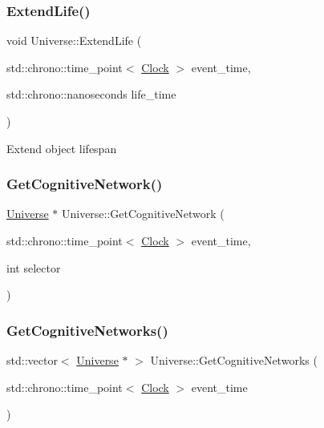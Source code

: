 \subsubsection{\texorpdfstring{Extend\+Life()}{ExtendLife()}}
{\footnotesize\ttfamily void Universe\+::\+Extend\+Life (\begin{DoxyParamCaption}\item[{std\+::chrono\+::time\+\_\+point$<$ \mbox{\hyperlink{universe_8h_a0ef8d951d1ca5ab3cfaf7ab4c7a6fd80}{Clock}} $>$}]{event\+\_\+time,  }\item[{std\+::chrono\+::nanoseconds}]{life\+\_\+time }\end{DoxyParamCaption})}

Extend object lifespan\mbox{\label{classUniverse_a1ea2b7e438bfdc7dd599aa59c310b126}} 
\subsubsection{\texorpdfstring{Get\+Cognitive\+Network()}{GetCognitiveNetwork()}}
{\footnotesize\ttfamily \mbox{\hyperlink{classUniverse}{Universe}} $\ast$ Universe\+::\+Get\+Cognitive\+Network (\begin{DoxyParamCaption}\item[{std\+::chrono\+::time\+\_\+point$<$ \mbox{\hyperlink{universe_8h_a0ef8d951d1ca5ab3cfaf7ab4c7a6fd80}{Clock}} $>$}]{event\+\_\+time,  }\item[{int}]{selector }\end{DoxyParamCaption})}

\mbox{\label{classUniverse_a06968a24194280a43f077c5b77379ea8}} 
\subsubsection{\texorpdfstring{Get\+Cognitive\+Networks()}{GetCognitiveNetworks()}}
{\footnotesize\ttfamily std\+::vector$<$ \mbox{\hyperlink{classUniverse}{Universe}} $\ast$ $>$ Universe\+::\+Get\+Cognitive\+Networks (\begin{DoxyParamCaption}\item[{std\+::chrono\+::time\+\_\+point$<$ \mbox{\hyperlink{universe_8h_a0ef8d951d1ca5ab3cfaf7ab4c7a6fd80}{Clock}} $>$}]{event\+\_\+time }\end{DoxyParamCaption})}

